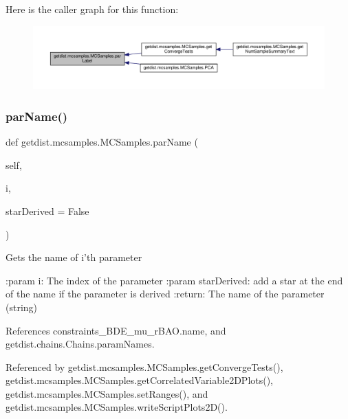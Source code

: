 Here is the caller graph for this function\+:
\nopagebreak
\begin{figure}[H]
\begin{center}
\leavevmode
\includegraphics[width=350pt]{classgetdist_1_1mcsamples_1_1MCSamples_aec090ebdf609820d084391a9901f0214_icgraph}
\end{center}
\end{figure}
\mbox{\label{classgetdist_1_1mcsamples_1_1MCSamples_a785dc1b8abd13411a1efa1e2f626fc26}} 
\subsubsection{\texorpdfstring{par\+Name()}{parName()}}
{\footnotesize\ttfamily def getdist.\+mcsamples.\+M\+C\+Samples.\+par\+Name (\begin{DoxyParamCaption}\item[{}]{self,  }\item[{}]{i,  }\item[{}]{star\+Derived = {\ttfamily False} }\end{DoxyParamCaption})}

\begin{DoxyVerb}Gets the name of i'th parameter

:param i: The index of the parameter
:param starDerived: add a star at the end of the name if the parameter is derived
:return: The name of the parameter (string)
\end{DoxyVerb}
 

References constraints\+\_\+\+B\+D\+E\+\_\+mu\+\_\+r\+B\+A\+O.\+name, and getdist.\+chains.\+Chains.\+param\+Names.



Referenced by getdist.\+mcsamples.\+M\+C\+Samples.\+get\+Converge\+Tests(), getdist.\+mcsamples.\+M\+C\+Samples.\+get\+Correlated\+Variable2\+D\+Plots(), getdist.\+mcsamples.\+M\+C\+Samples.\+set\+Ranges(), and getdist.\+mcsamples.\+M\+C\+Samples.\+write\+Script\+Plots2\+D().

